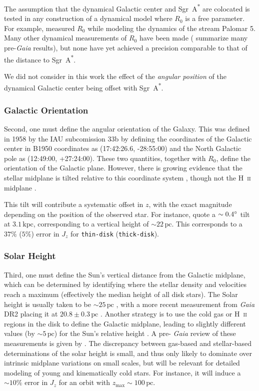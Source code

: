 \documentclass[twocolumn]{aastex62}
\newcommand{\pc}{\text{pc}}
\newcommand{\kpc}{\text{kpc}}
\newcommand{\sgra}{Sgr~A\textsuperscript{*}}
\newcommand{\thin}{\texttt{thin-disk}}
\newcommand{\thick}{\texttt{thick-disk}}
\begin{document}
The assumption that the dynamical Galactic center and \sgra{} are colocated is
tested in any construction of a dynamical model where $R_0$ is a free
parameter. For example, \citet{2015ApJ...803...80K} measured $R_0$ while
modeling the dynamics of the stream Palomar 5. Many other dynamical
measurements of $R_0$ have been made (\citealt{2016ARAA..54..529B} summarize
many pre-\textit{Gaia} results), but none have yet achieved a precision
comparable to that of the distance to \sgra{}.

We did not consider in this work the effect of the \emph{angular position} of
the dynamical Galactic center being offset with \sgra{}.

\subsubsection{Galactic Orientation}
Second, one must define the angular orientation of the Galaxy. This was
defined in 1958 by the IAU subcomission 33b \citep{1960MNRAS.121..123B} by
defining the coordinates of the Galactic center in B1950 coordinates as
(17:42:26.6, -28:55:00) and the North Galactic pole as (12:49:00, +27:24:00).
These two quantities, together with $R_0$, define the orientation of the
Galactic plane. However, there is growing evidence that the stellar midplane
is tilted relative to this coordinate system \citep{2014ApJ...797...53G,
2016ARAA..54..529B}, though not the H~\textsc{ii} midplane
\citep{2019ApJ...871..145A}.

This tilt will contribute a systematic offset in $z$, with the exact magnitude
depending on the position of the observed star. For instance,
\citet{2014ApJ...797...53G} quote a $\sim0.4\degree$ tilt at $3.1\,\kpc$,
corresponding to a vertical height of $\sim22\,\pc$. This corresponds to a
$37\%$ ($5\%$) error in $J_z$ for \thin{} (\thick{}).

\subsubsection{Solar Height}
Third, one must define the Sun's vertical distance from the Galactic midplane,
which can be determined by identifying where the stellar density and
velocities reach a maximum (effectively the median height of all disk stars).
The Solar height is usually taken to be $\sim 25\,\pc$
\citep{2001ApJ...553..184C}, with a more recent measurement from \textit{Gaia}
DR2 placing it at $20.8 \pm 0.3\,\pc$ \citep{2019MNRAS.482.1417B}. Another
strategy is to use the cold gas or H~\textsc{ii} regions in the disk to define
the Galactic midplane, leading to slightly different values (by $\sim 5\,\pc$)
for the Sun's relative height \citep[e.g.,][]{2019ApJ...871..145A}. A pre-\textit{
Gaia} review of these measurements is given by \citet{2016ARAA..54..529B}. The discrepancy between gas-based and stellar-based determinations of the solar height is small, and thus only likely to dominate over intrinsic midplane variations on small scales, but will be relevant for detailed modeling of young and kinematically cold stars. For instance, it will induce a $\sim10\%$ error in $J_z$ for an
orbit with $z_{\text{max}}\sim100\,\pc$.
\end{document}
